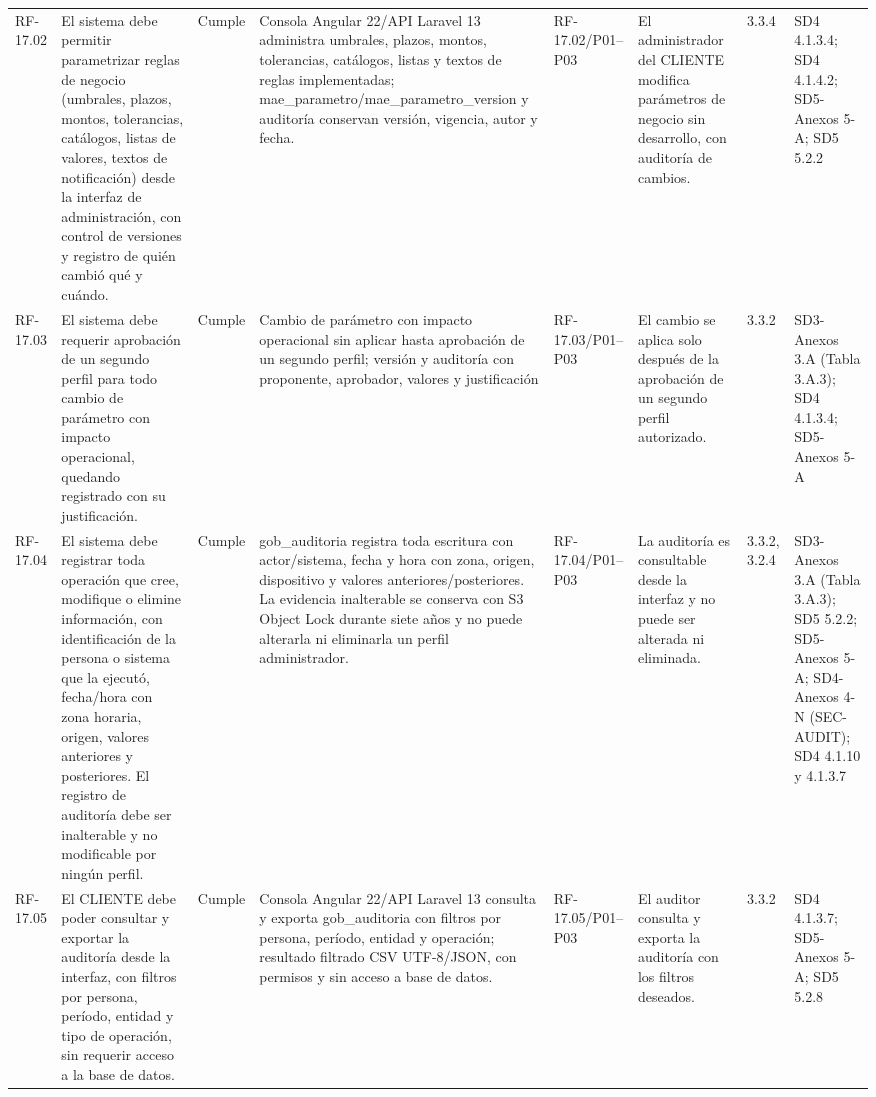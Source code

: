 \documentclass[oficio,firma,final]{lafrox}
\begin{document}
\begin{landscape}
{\begin{longtable}{@{}F{0.054} F{0.173} F{0.061} F{0.191} F{0.106} F{0.180} F{0.067} F{0.168}@{}}
  RF-17.02 & El sistema debe permitir parametrizar reglas de negocio (umbrales, plazos, montos, tolerancias, catálogos, listas de valores, textos de notificación) desde la interfaz de administración, con control de versiones y registro de quién cambió qué y cuándo. & Cumple & Consola Angular 22/API Laravel 13 administra umbrales, plazos, montos, tolerancias, catálogos, listas y textos de reglas implementadas; mae\_parametro/mae\_parametro\_version y auditoría conservan versión, vigencia, autor y fecha. & RF-17.02/\allowbreak{}P01--\allowbreak{}P03 & El administrador del CLIENTE modifica parámetros de negocio sin desarrollo, con auditoría de cambios. & 3.3.4 & SD4 4.1.3.4; SD4 4.1.4.2; SD5-Anexos 5-A; SD5 5.2.2  \\
  RF-17.03 & El sistema debe requerir aprobación de un segundo perfil para todo cambio de parámetro con impacto operacional, quedando registrado con su justificación. & Cumple & Cambio de parámetro con impacto operacional sin aplicar hasta aprobación de un segundo perfil; versión y auditoría con proponente, aprobador, valores y justificación & RF-17.03/\allowbreak{}P01--\allowbreak{}P03 & El cambio se aplica solo después de la aprobación de un segundo perfil autorizado. & 3.3.2 & SD3-Anexos 3.A (Tabla 3.A.3); SD4 4.1.3.4; SD5-Anexos 5-A  \\
  RF-17.04 & El sistema debe registrar toda operación que cree, modifique o elimine información, con identificación de la persona o sistema que la ejecutó, fecha/hora con zona horaria, origen, valores anteriores y posteriores. El registro de auditoría debe ser inalterable y no modificable por ningún perfil. & Cumple & gob\_auditoria registra toda escritura con actor/sistema, fecha y hora con zona, origen, dispositivo y valores anteriores/posteriores. La evidencia inalterable se conserva con S3 Object Lock durante siete años y no puede alterarla ni eliminarla un perfil administrador. & RF-17.04/\allowbreak{}P01--\allowbreak{}P03 & La auditoría es consultable desde la interfaz y no puede ser alterada ni eliminada. & 3.3.2, 3.2.4 & SD3-Anexos 3.A (Tabla 3.A.3); SD5 5.2.2; SD5-Anexos 5-A; SD4-Anexos 4-N (SEC-AUDIT); SD4 4.1.10 y 4.1.3.7  \\
  RF-17.05 & El CLIENTE debe poder consultar y exportar la auditoría desde la interfaz, con filtros por persona, período, entidad y tipo de operación, sin requerir acceso a la base de datos. & Cumple & Consola Angular 22/API Laravel 13 consulta y exporta gob\_auditoria con filtros por persona, período, entidad y operación; resultado filtrado CSV UTF-8/JSON, con permisos y sin acceso a base de datos. & RF-17.05/\allowbreak{}P01--\allowbreak{}P03 & El auditor consulta y exporta la auditoría con los filtros deseados. & 3.3.2 & SD4 4.1.3.7; SD5-Anexos 5-A; SD5 5.2.8  \\

\end{longtable}}
\end{landscape}
\end{document}
